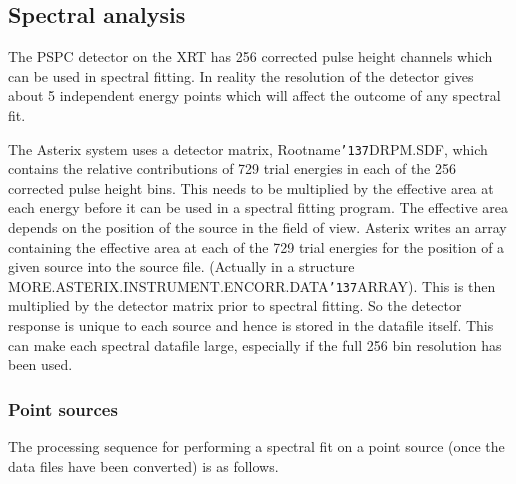 \documentclass{book}
\renewcommand{\_}{{\tt\char'137}}     %
\begin{document}
\subsection{Spectral analysis}
The PSPC detector on the XRT has 256 corrected pulse height channels
which can be used in spectral fitting. In reality the resolution of
the detector gives about 5 independent energy points which will affect
the outcome of any spectral fit.
 
The Asterix system uses a detector matrix, Rootname\_DRPM.SDF, which
contains the relative contributions of 729 trial energies in each
of the 256 corrected pulse height bins. This needs to be multiplied
by the effective area at each energy before it can be used in a
spectral fitting program. The effective area depends on the position
of the source in the field of view. Asterix writes an array containing
the effective area at each of the 729 trial energies for the position
of a given source into the source file. (Actually in a structure
MORE.ASTERIX.INSTRUMENT.ENCORR.DATA\_ARRAY). This is then multiplied by
the detector matrix prior to spectral fitting. So the detector response
is unique to each source and hence is stored in the datafile itself.
This can make each spectral datafile large, especially if the full 256
bin resolution has been used.
 
\subsubsection{Point sources}
The processing sequence for performing a spectral fit on a point
source (once the data files have been converted) is as follows.
 
\end{document}
